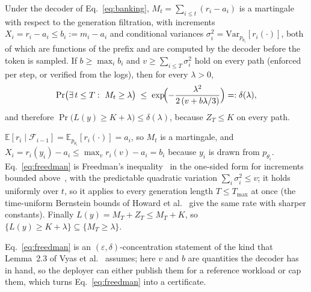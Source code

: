 \begin{proposition}\label{prop:conc}
Under the decoder of Eq.~\eqref{eq:banking}, $M_t = \sum_{i \le t} (r_i - a_i)$ is a martingale with respect to the generation filtration, with increments $X_i = r_i - a_i \le b_i := m_i - a_i$ and conditional variances $\sigma_i^2 = \mathrm{Var}_{p_{\theta_i}}[r_i(\cdot)]$, both of which are functions of the prefix and are computed by the decoder before the token is sampled. If $b \ge \max_i b_i$ and $v \ge \sum_{i \le T} \sigma_i^2$ hold on every path (enforced per step, or verified from the logs), then for every $\lambda > 0$,
\begin{equation}
\Pr\bigl(\exists\, t \le T:\ M_t \ge \lambda\bigr) \;\le\; \exp\!\Bigl(-\frac{\lambda^2}{2\,(v + b\lambda/3)}\Bigr) =: \delta(\lambda),
\label{eq:freedman}
\end{equation}
and therefore $\Pr\bigl(L(y) \ge K + \lambda\bigr) \le \delta(\lambda)$, because $Z_T \le K$ on every path.
\end{proposition}
\begin{IEEEproof}
$\mathbb{E}[r_i \mid \mathcal{F}_{i-1}] = \mathbb{E}_{p_{\theta_i}}[r_i(\cdot)] = a_i$, so $M_t$ is a martingale, and $X_i = r_i(y_i) - a_i \le \max_v r_i(v) - a_i = b_i$ because $y_i$ is drawn from $p_{\theta_i}$. Eq.~\eqref{eq:freedman} is Freedman's inequality~\cite{freedman1975tail} in the one-sided form for increments bounded above~\cite[Thm.~1.1, scalar case]{tropp2011freedman}, with the predictable quadratic variation $\sum_i \sigma_i^2 \le v$; it holds uniformly over $t$, so it applies to every generation length $T \le T_{\max}$ at once (the time-uniform Bernstein bounds of Howard et al.~\cite{howard2021timeuniform} give the same rate with sharper constants). Finally $L(y) = M_T + Z_T \le M_T + K$, so $\{L(y) \ge K + \lambda\} \subseteq \{M_T \ge \lambda\}$.
\end{IEEEproof}
Eq.~\eqref{eq:freedman} is an $(\varepsilon,\delta)$-concentration statement of the kind that Lemma~2.3 of Vyas et al.~\cite{vyas2023provable} assumes; here $v$ and $b$ are quantities the decoder has in hand, so the deployer can either publish them for a reference workload or cap them, which turns Eq.~\eqref{eq:freedman} into a certificate.


